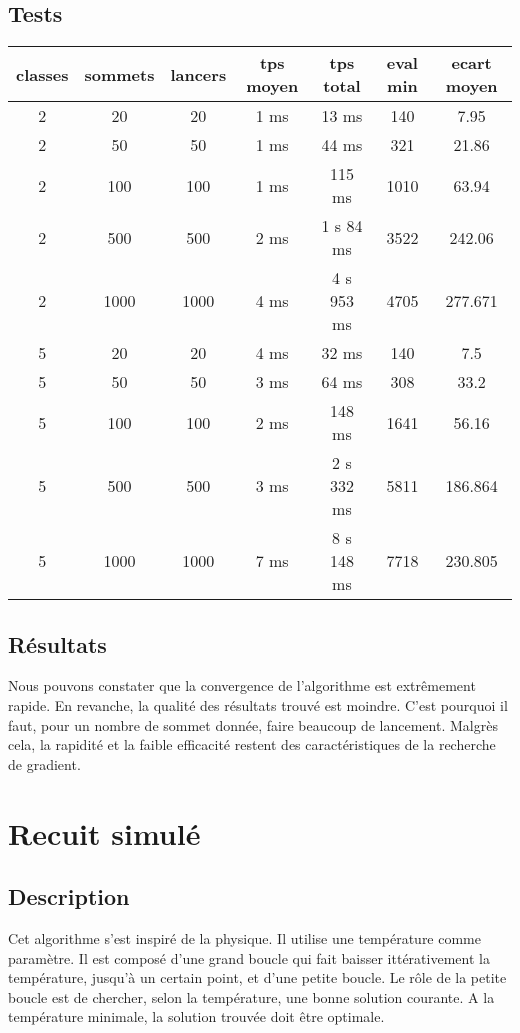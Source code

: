 \documentclass[12pt]{article}
\begin{document}
\subsection{Tests}

\begin{tabular}{|c|c|c|c|c|c|c|}
	\hline 
	classes & sommets & lancers & tps moyen & tps total & eval min & ecart moyen \\
	\hline
2 & 20 & 20 & 1 ms & 13 ms & 140 & 7.95 \\ 
	\hline
2 &  50  &  50  &  1   ms   &  44 ms   &  321  & 21.86 \\ 
	\hline
2 &  100  &  100  & 1  ms   &  115 ms    &  1010   & 63.94  \\ 
	\hline
   2 &  500  &  500  &   2 ms  &  1  s  84  ms   & 3522  & 242.06\\
   \hline
   2 &  1000  &  1000  &  4  ms & 4  s 953 ms & 4705 & 277.671 \\ 
	\hline
	\hline
5 &  20  &  20  & 4 ms &  32 ms    &  140   & 7.5 \\
	\hline
5 &  50  &  50  & 3 ms &  64 ms   & 308 & 33.2 \\ 
	\hline
5 &  100  & 100   & 2  ms   &  148 ms    & 1641 & 56.16 \\
	\hline
   5 & 500 & 500 & 3 ms   &  2 s 332 ms   &   5811  & 186.864 \\
   \hline
   5 &  1000  &  1000  & 7 ms &  8 s 148 ms & 7718 & 230.805 \\ 
	\hline
\end{tabular}

\subsection{Résultats}

Nous pouvons constater que la convergence de l'algorithme est extrêmement rapide. En revanche, la qualité des résultats trouvé est moindre. C'est pourquoi il faut, pour un nombre de sommet donnée, faire beaucoup de lancement. Malgrès cela, la rapidité et la faible efficacité restent des caractéristiques de la recherche de gradient.


\newpage

\section{Recuit simulé}
\subsection{Description}
Cet algorithme s'est inspiré de la physique. Il utilise une température comme paramètre. Il est composé d'une grand boucle qui fait baisser ittérativement la température, jusqu'à un certain point, et d'une petite boucle. Le rôle de la petite boucle est de chercher, selon la température, une bonne solution courante. A la température minimale, la solution trouvée doit être optimale.
\end{document}
